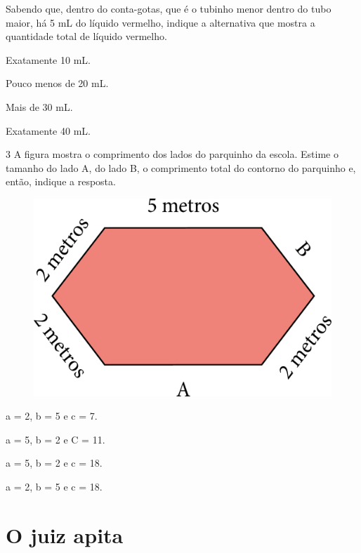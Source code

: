 \pagebreak

Sabendo que, dentro do conta-gotas, que é o tubinho menor dentro do tubo
maior, há 5 mL do líquido vermelho, indique a alternativa que mostra a
quantidade total de líquido vermelho.

\begin{escolha}[itemsep=-5pt]
\item Exatamente 10 mL.

\item Pouco menos de 20 mL.

\item Mais de 30 mL.

\item Exatamente 40 mL.
\end{escolha}

\num{3} A figura mostra o comprimento dos lados do parquinho da escola.
Estime o tamanho do lado A, do lado B, o comprimento total do contorno
do parquinho e, então, indique a resposta.

\begin{figure}[htpb!]
\centering
\includegraphics[width=.5\textwidth]{./media/image47.png}
\end{figure}

\begin{escolha}[itemsep=-5pt]
\item a = 2, b = 5 e c = 7.

\item a = 5, b = 2 e C = 11.

\item a = 5, b = 2 e c = 18.

\item a = 2, b = 5 e c = 18.
\end{escolha}

\chapter{O juiz apita}

\vspace*{-1cm}

